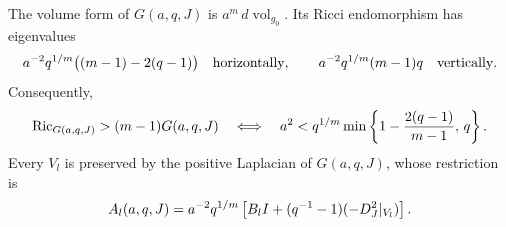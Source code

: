 \begin{lemma}\label{lem:berger-metrics}
The volume form of \(G(a,q,J)\) is \(a^m\,d\operatorname{vol}_{g_0}\).
Its Ricci endomorphism has eigenvalues
\[
 a^{-2}q^{1/m}\bigl((m-1)-2(q-1)\bigr)
 \quad\hbox{horizontally},\qquad
 a^{-2}q^{1/m}(m-1)q
 \quad\hbox{vertically}.
\]
Consequently,
\begin{equation}\label{eq:link-margin}
 \operatorname{Ric}_{G(a,q,J)}>(m-1)G(a,q,J)
 \quad\Longleftrightarrow\quad
 a^2<q^{1/m}
       \min\left\{1-\frac{2(q-1)}{m-1},\,q\right\}.
\end{equation}
Every \(V_l\) is preserved by the positive Laplacian of \(G(a,q,J)\),
whose restriction is
\begin{equation}\label{eq:angular-operator}
 A_l(a,q,J)
 =a^{-2}q^{1/m}
       \left[B_lI+(q^{-1}-1)(-D_J^2|_{V_l})\right].
\end{equation}
\end{lemma}

